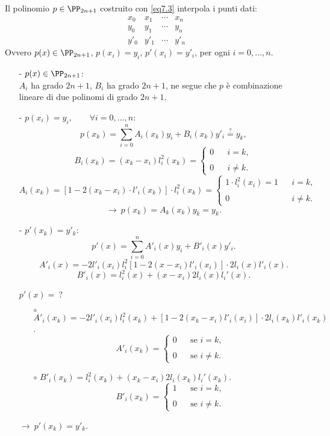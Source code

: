 \begin{prop}
Il polinomio $p \in \PP_{2n+1}$ costruito con \ref{eq7.3} interpola i punti 
dati:
\[\begin{array}{ccccc}
x_0 & x_1 & \cdots & x_n   \\
y_0 & y_1 & \cdots & y_n  \\
y'_0 & y'_1 & \cdots & y'_n  
\end{array}\]
Ovvero $p(x) \in \PP_{2n +1}$, $p(x_i) = y_i,\, p'(x_i) = y'_i$, per ogni $i =
0, \ldots, n$.
\end{prop}
\begin{dimo}
\begin{itemize}
\item[-] $p(x) \in \PP_{2n+1}$:\\

$A_i$ ha grado $2n+1$, $B_i$ ha grado $2n+1$, ne segue che $p$ è combinazione
lineare di due polinomi di grado $2n+1$.
\item[-]$p(x_i) = y_i,\qquad \forall i = 0, \ldots , n$:
\[p(x_k) = \sum_{i=0}^n A_i(x_k)y_i + B_i(x_k)y'_i \stackrel{?}{=} y_k,\]
\[
B_i(x_k) = (x_k-x_i)l_i^2(x_k) = \left\{\begin{array}{lcr}0 & & i = k, \\ \\
0 & &i \neq k.\end{array}\right.\]
\[
A_i(x_k) = \left[1-2(x_k-x_i)\cdot l'_i(x_k)\right]\cdot l_i^2(x_k) =
\left\{\begin{array}{lcr}
1 \cdot l_i^2(x_i) = 1 & & i = k, \\
\\
0 & & i \neq k.
\end{array}\right.
\]
\[
\longrightarrow \ p(x_k) = A_k(x_k) y_k = y_k.
\]
\item[-]$p'(x_k) = y'_k$:
\[p'(x) = \sum_{i=0}^nA'_i(x)y_i + B'_i(x)y'_i.\]
\[A'_i(x) = -2 l'_i (x_i)l_i^2[1-2(x-x_i)l'_i(x_i)]\cdot 2l_i(x)l'_i(x).\]
\[B'_i(x) = l_i^2(x) + (x-x_i)2l_i(x)l_i'(x).\]

$p'(x) = \ $?

\begin{itemize}
\item[$\circ$]
$A'_i(x_k) = -2 l'_i(x_i)l^2_i(x_k) + 
[1-2(x_k-x_i)l'_i(x_i)]\cdot 2l_i(x_k)l'_i(x_k)$.
\[
A'_i(x_k) = \left\{\begin{array}{lcr}0 & & \textrm{se } i = k, \\
\\
0 & & \textrm{se } i \neq k.
\end{array}\right.
\]
\item[$\circ$]$B'_i(x_k) = l_i^2(x_k) + (x_k-x_i)2l_i(x_k)l_i'(x_k)$.
\[
B'_i(x_k) = \left\{\begin{array}{lcr}1 & & \textrm{se } i = k, \\
\\
0 & & \textrm{se } i \neq k.
\end{array}\right.
\]
\end{itemize}
$\longrightarrow \ p'(x_k) = y'_k$.
\end{itemize}
\end{dimo}

